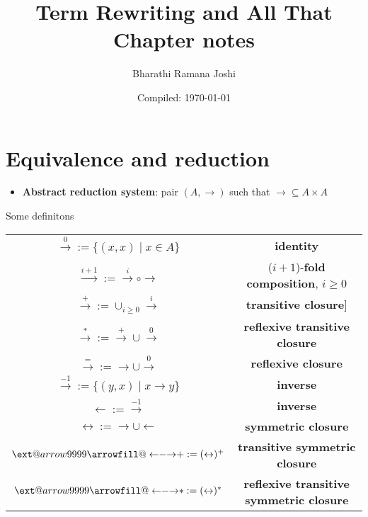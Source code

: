 \documentclass[titlepage, 12pt]{article}
\makeatletter
\newcommand\xleftrightarrow[2][]{%
\ext@arrow 9999{\longleftrightarrowfill@}{#1}{#2}}
\newcommand\longleftrightarrowfill@{%
\arrowfill@\leftarrow\relbar\rightarrow}
\makeatother
\begin{document}
\title{Term Rewriting and All That\\Chapter  notes}

\author{Bharathi Ramana Joshi}

\date{Compiled: \today}

\newpage

\section{Equivalence and reduction}

\begin{itemize}

  \item\textbf{Abstract reduction system}: pair $(A,\rightarrow)$ such that
    $\rightarrow\subseteq A\times A$

\end{itemize}
Some definitons

\begin{center}
  \begin{tabular}{c c}

    $\xrightarrow{0} := \{(x, x)\mid x\in A\}$ & \textbf{identity}\\

    $\xrightarrow{i+1} := \xrightarrow{i}\circ\rightarrow$ &
    ($i+1$)-\textbf{fold composition}, $i\ge 0$\\

    $\xrightarrow{+} := \cup_{i\ge 0}\xrightarrow{i}$ & \textbf{transitive
    closure}]\\

      $\xrightarrow{*} := \xrightarrow{+}\cup\xrightarrow{0}$ &
      \textbf{reflexive transitive closure}\\

      $\xrightarrow{=} := \rightarrow\cup\xrightarrow{0}$ & \textbf{reflexive
      closure}\\

        $\xrightarrow{-1} := \{(y, x)\mid x\rightarrow y\}$ & \textbf{inverse}\\

        $\leftarrow := \xrightarrow{-1}$ & \textbf{inverse}\\

        $\leftrightarrow := \rightarrow\cup\leftarrow$ & \textbf{symmetric
        closure}\\

          $\xleftrightarrow{+} := (\leftrightarrow)^+$ & \textbf{transitive symmetric
          closure}\\

            $\xleftrightarrow{*} := (\leftrightarrow)^*$ & \textbf{reflexive transitive
            symmetric closure}

  \end{tabular}
\end{center}
\end{document}
